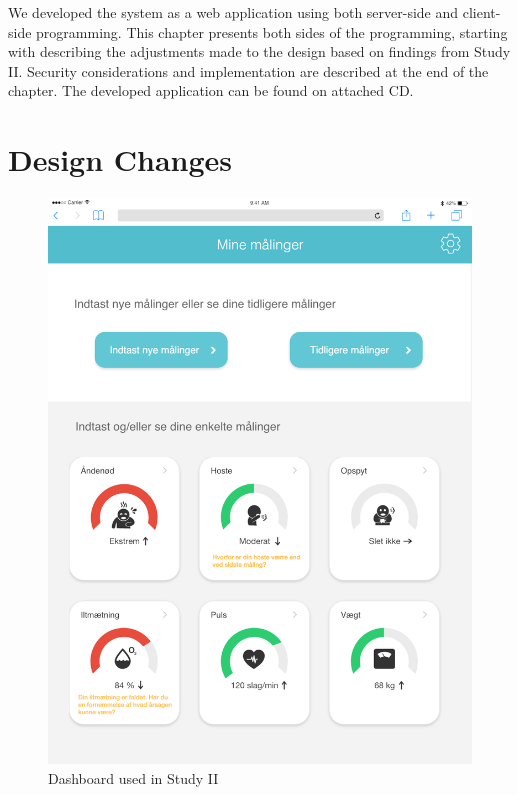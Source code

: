 We developed the system as a web application using both server-side and client-side programming. This chapter presents both sides of the programming, starting with describing the adjustments made to the design based on findings from Study II. Security considerations and implementation are described at the end of the chapter. The developed application can be found on attached CD. 

\section{Design Changes}

\begin{figure}[h]
  \centering
  \begin{minipage}[b]{0.45\textwidth}
    \includegraphics[width=\textwidth]{images/study2/Dashboard.png}
    \caption{Dashboard used in Study II}
    \label{fig:db1st}
  \end{minipage}
  \hfill
  \begin{minipage}[b]{0.45\textwidth}

\end{minipage}
\end{figure}
